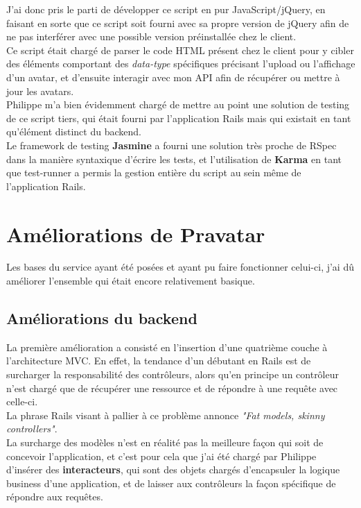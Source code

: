 \documentclass{report}
\begin{document}
      J'ai donc pris le parti de développer ce script en pur JavaScript/jQuery, en faisant en sorte que ce script soit fourni avec sa propre version de jQuery afin de ne pas interférer avec une
      possible version préinstallée chez le client.\\
      Ce script était chargé de parser le code HTML présent chez le client pour y cibler des éléments comportant des \textit{data-type} spécifiques précisant l'upload ou l'affichage d'un avatar, et d'ensuite
      interagir avec mon API afin de récupérer ou mettre à jour les avatars.\\

      Philippe m'a bien évidemment chargé de mettre au point une solution de testing de ce script tiers, qui était fourni par l'application Rails mais qui existait en tant qu'élément distinct du backend.\\
      Le framework de testing \textbf{Jasmine} a fourni une solution très proche de RSpec dans la manière syntaxique d'écrire les tests, et l'utilisation de \textbf{Karma} en tant que test-runner a
      permis la gestion entière du script au sein même de l'application Rails.\\

  \section{Améliorations de Pravatar}
  \label{sec:Améliorations de Pravatar}

    Les bases du service ayant été posées et ayant pu faire fonctionner celui-ci, j'ai dû améliorer l'ensemble qui était encore relativement basique.\\

    \subsection{Améliorations du backend}
    \label{subs:Améliorations du backend}

      La première amélioration a consisté en l'insertion d'une quatrième couche à l'architecture MVC. En effet, la tendance d'un débutant en Rails est de surcharger la responsabilité des contrôleurs, alors qu'en
      principe un contrôleur n'est chargé que de récupérer une ressource et de répondre à une requête avec celle-ci.\\
      La phrase Rails visant à pallier à ce problème annonce \textit{"Fat models, skinny controllers"}.\\
      La surcharge des modèles n'est en réalité pas la meilleure façon qui soit de concevoir l'application, et c'est pour cela que j'ai été chargé par Philippe d'insérer des \textbf{interacteurs}, qui sont des
      objets chargés d'encapsuler la logique business d'une application, et de laisser aux contrôleurs la façon spécifique de répondre aux requêtes.\\
\end{document}
